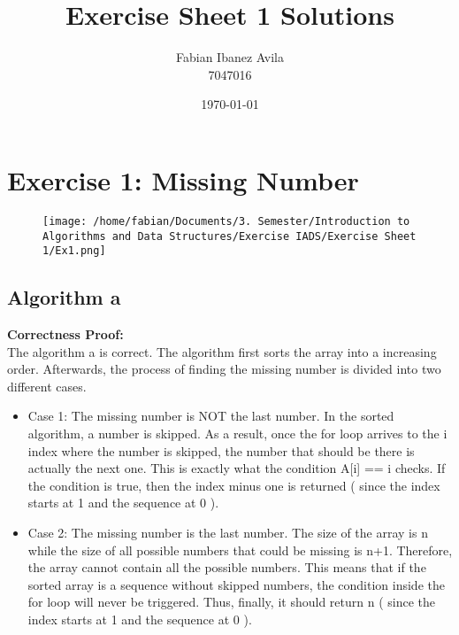 \documentclass[a4paper,11pt]{article}
\title{Exercise Sheet 1 Solutions}
\author{ Fabian Ibanez Avila \\ 7047016}
\date{\today}
\begin{document}
	
	\maketitle
	
	\section*{Exercise 1: Missing Number}
	
	\begin{figure}[htpb]
		\centering
		\texttt{[image: /home/fabian/Documents/3. Semester/Introduction to Algorithms and Data Structures/Exercise IADS/Exercise Sheet 1/Ex1.png]}
	\end{figure}
	
	\subsection*{Algorithm a}
	\textbf{Correctness Proof:} \\
	The algorithm a is correct. The algorithm first sorts the array into a increasing order. Afterwards, the process of finding the missing number is divided into two different cases. 
	\begin{itemize}
		\item Case 1: The missing number is NOT the last number. 
		\subitem In the sorted algorithm, a number is skipped. As a result, once the for loop arrives to the i index where the number is skipped, the number that should be there is actually the next one. This is exactly what the condition A[i] == i checks. If the condition is true, then the index minus one is returned ( since the index starts at 1 and the sequence at 0 ).
		\item Case 2: The missing number is the last number.
		\subitem The size of the array is n while the size of all possible numbers that could be missing is n+1. Therefore, the array cannot contain all the possible numbers. This means that if the sorted array is a sequence without skipped numbers, the condition inside the for loop will never be triggered. Thus, finally, it should return n ( since the index starts at 1 and the sequence at 0 ).
	\end{itemize}
	
\end{document}
